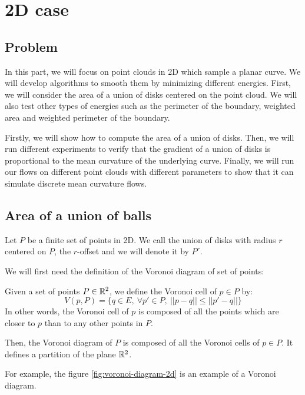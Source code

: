 \chapter{2D case}

\section{Problem}

In this part, we will focus on point clouds in 2D which sample a planar curve.
We will develop algorithms to smooth them by minimizing different energies. First, we
will consider the area of a union of disks centered on the point cloud.  We will
also test other types of energies such as the perimeter of the boundary,
weighted area and weighted perimeter of the boundary.

Firstly, we will show how to compute the area of a union of disks.  Then, we
will run different experiments to verify that the gradient of a union of disks
is proportional to the mean curvature of the underlying curve. Finally, we will
run our flows on different point clouds with different parameters to show
that it can simulate discrete mean curvature flows.

\section{Area of a union of balls}

Let $ P $ be a finite set of points in 2D.  We call the union of disks with
radius $ r $ centered on $ P $, the $r$-offset and we will denote it by $ P^r $.

We will first need the definition of the Voronoi diagram of set of points:

\begin{definition}
    Given a set of points $ P \in \mathbb{R}^2 $, we define the Voronoi cell of $ p \in
    P $ by:
    $$ V(p, P) = \{ q \in E,~ \forall p' \in P,~|| p  - q || \leq || p' -
    q || \} $$
    In other words, the Voronoi cell of $ p $ is composed of all the points which are
    closer to $ p $ than to any other points in $ P $.

    Then, the Voronoi diagram of $ P $ is composed of all the Voronoi cells of $
    p \in P $. It defines a partition of the plane $ \mathbb{R}^2 $.
\end{definition}

For example, the figure \ref{fig:voronoi-diagram-2d} is an example of a Voronoi
diagram.

